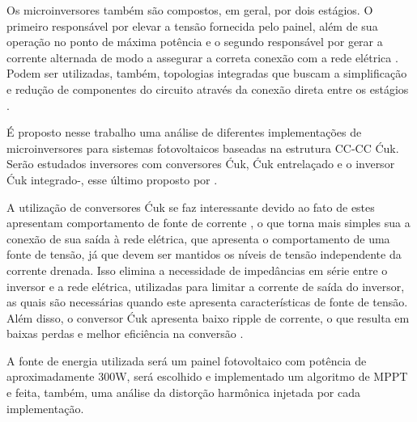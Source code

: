 \documentclass[
	12pt,				%
	openany,
	onseside,
	a4paper,			%
	english,			%
	french,				%
	spanish,			%
	brazil,				%
	]{abntex2}
\begin{document}
	Os microinversores também são compostos, em geral, por dois estágios. O primeiro responsável por elevar a tensão fornecida pelo painel, além de sua operação no ponto de máxima potência e o segundo responsável por gerar a corrente alternada de modo a assegurar a correta conexão com a rede elétrica \cite{Nezamuddin_des_eff_micro}. Podem ser utilizadas, também, topologias integradas que buscam a simplificação e redução de componentes do circuito através da conexão direta entre os estágios \cite{LUIGI_int_top} \cite{LUIGIJUNIOR_ev_int}.

	
	É proposto nesse trabalho uma análise de diferentes implementações de microinversores para sistemas fotovoltaicos baseadas na estrutura CC-CC Ćuk. Serão estudados inversores com conversores Ćuk, Ćuk entrelaçado e o inversor Ćuk integrado-, esse último proposto por \cite{LUIGI_int_top}.

	A utilização de conversores Ćuk se faz interessante devido ao fato de estes apresentam comportamento de fonte de corrente \cite{LUIGIJUNIOR_ev_int}, o que torna mais simples sua a conexão de sua saída à rede elétrica, que apresenta o comportamento de uma fonte de tensão, já que devem ser mantidos os níveis de tensão independente da corrente drenada. Isso elimina a necessidade de impedâncias em série entre o inversor e a rede elétrica, utilizadas para limitar a corrente de saída do inversor, as quais são necessárias quando este apresenta características de fonte de tensão. Além disso, o conversor Ćuk apresenta baixo ripple de corrente, o que resulta em baixas perdas e melhor eficiência na conversão \cite{Shawky_perform_anal}.



	A fonte de energia utilizada será um painel fotovoltaico com potência de aproximadamente 300W, será escolhido e implementado um algoritmo de MPPT e feita, também,  uma análise da distorção harmônica injetada por cada implementação.
%
%
%
\end{document}
